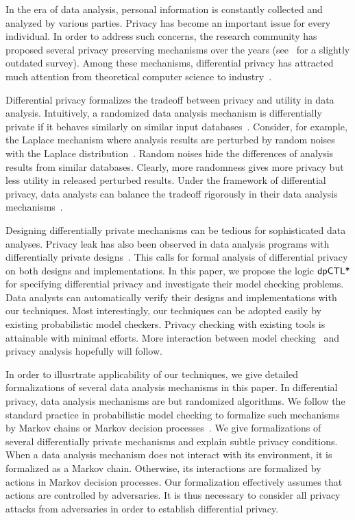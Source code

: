 

In the era of data analysis, personal information is constantly
collected and analyzed by various parties. Privacy has become an
important issue for every individual. In order to address such
concerns, the research community has proposed several privacy
preserving mechanisms over the years (see~\cite{FWC:10:PPDP} for a
slightly outdated survey). Among these mechanisms, differential
privacy has attracted much attention from theoretical computer science
to industry~\cite{DR:14:AFDP,JLE:14:DPML,A:16:EPYU}.

Differential privacy formalizes the tradeoff between privacy and
utility in data analysis. Intuitively, a randomized data analysis
mechanism is differentially private if it behaves similarly on similar
input databases~\cite{DMNS:06:CNSPD,D:06:DP}. Consider, for example,
the Laplace mechanism where analysis results are perturbed by random
noises with the Laplace distribution~\cite{DR:14:AFDP}. Random noises
hide the differences of analysis results from similar databases.
Clearly, more
randomness gives more privacy but less utility in released perturbed
results. Under the framework of differential privacy, data analysts
can balance the tradeoff rigorously in their data analysis
mechanisms~\cite{DR:14:AFDP,JLE:14:DPML}.


Designing differentially private mechanisms can be tedious for
sophisticated data analyses. Privacy leak has also been observed in
data analysis programs with differentially private
designs~\cite{M:12:SLSBDP,TKBW:17:PLAI}. This calls for formal
analysis of differential privacy on both designs and implementations.
In this paper, we propose the logic $\textsf{dpCTL*}$ for specifying
differential privacy and investigate their model checking
problems. Data analysts can automatically verify their designs and
implementations with our techniques. Most interestingly, our
techniques can be adopted easily by existing probabilistic
model checkers. Privacy checking with existing tools is attainable
with minimal efforts. More interaction
between model checking~\cite{ManneP92,BK:08:PMC} and privacy analysis hopefully will follow.


In order to illusrtrate applicability of our techniques, we give
detailed formalizations of several data analysis mechanisms in this
paper.
In differential privacy, data analysis mechanisms are
but randomized algorithms. We follow the standard practice in
probabilistic model checking to formalize such mechanisms
by Markov chains or Markov decision processes~\cite{Put05}. We give
formalizations of several differentially private mechanisms and
explain subtle privacy conditions.
When a data analysis mechanism does not
interact with its environment, it is formalized as a Markov
chain. Otherwise, its interactions are formalized by actions in
Markov decision processes. Our formalization effectively assumes that
actions are controlled by adversaries. It is thus necessary to
consider all privacy attacks from adversaries in order to establish
differential privacy.

